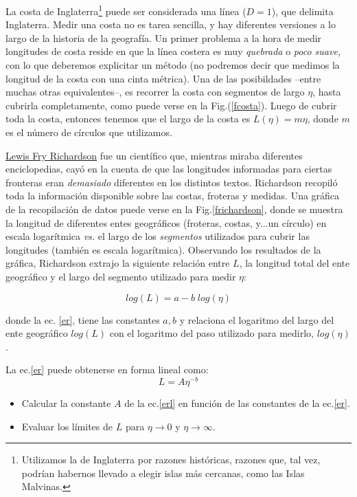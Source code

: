 \documentclass[10pt,a4paper]{article}
\numberwithin{equation}{section}
\begin{document}
La costa de Inglaterra\footnote{Utilizamos la de Inglaterra por razones históricas, razones que, tal vez, podrían habernos llevado a elegir islas más cercanas, como las Islas Malvinas.} puede ser considerada una línea ($D = 1$), que delimita Inglaterra. Medir una costa no es tarea sencilla, y hay diferentes versiones a lo largo de la historia de la geografía. Un primer problema a la hora de medir longitudes de costa reside en que la línea costera es muy \textit{quebrada} o \textit{poco suave}, con lo que deberemos explicitar un método (no podremos decir que medimos la longitud de la costa con una cinta métrica). Una de las posibildades --entre muchas otras equivalentes--, es recorrer la costa con segmentos de largo $\eta$, hasta cubrirla completamente, como puede verse en la Fig.(\ref{fcosta}). Luego de cubrir toda la costa, entonces tenemos que el largo de la costa es $L(\eta) = m \eta$, donde $m$ es el número de círculos que utilizamos.

\href{https://es.wikipedia.org/wiki/Lewis_Fry_Richardson}{Lewis Fry Richardson} fue un científico que, mientras miraba diferentes enciclopedias, cayó en la cuenta de que las longitudes informadas para ciertas fronteras eran \textit{demasiado} diferentes en los distintos textos. Richardson recopiló toda la información disponible sobre las costas, froteras y medidas. Una gráfica de la recopilación de datos puede verse en la Fig.\eqref{frichardson}, donde se muestra la longitud de diferentes entes geográficos (froteras, costas, y...un círculo) en escala logarítmica \textit{vs.} el largo de los \textit{segmentos} utilizados para cubrir las longitudes (también es escala logarítmica). Observando los resultados de la gráfica, Richardson extrajo la siguiente relación entre $L$, la longitud total del ente geográfico y el largo del segmento utilizado para medir $\eta$:

\begin{equation}\label{er}
log(L) = a - b \; log(\eta) 
\end{equation}

\noindent donde la ec. \eqref{er}, tiene las constantes $a, b$ y relaciona el logaritmo del largo del ente geográfico $log(L)$ con el logaritmo del paso utilizado para medirlo, $log(\eta)$. 

La ec.\eqref{er} puede obtenerse en forma lineal como:
\begin{equation}\label{erl}
L = A \eta^{-b} 
\end{equation}

\begin{itemize}
\item[$\bullet$] Calcular la constante $A$ de la ec.\eqref{erl} en función de las constantes de la ec.\eqref{er}.
\item[$\bullet$] Evaluar los límites de $L$ para $\eta \rightarrow 0$ y $\eta \rightarrow \infty$.
\end{itemize}
\end{document}
